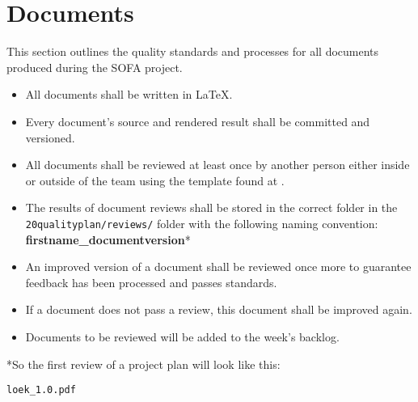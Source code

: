 \section{Documents}
This section outlines the quality standards and processes for all documents produced during the SOFA project.

\begin{itemize}
	\item All documents shall be written in LaTeX.
	\item Every document's source and rendered result shall be committed and versioned.
	\item All documents shall be reviewed at least once by another person either inside or outside of the team using the template found at .
	\item The results of document reviews shall be stored in the correct folder in the \texttt{20qualityplan/reviews/} folder with the following naming convention:\\
	\textbf{firstname\_documentversion}*
	\item An improved version of a document shall be reviewed once more to guarantee feedback has been processed and passes standards.
	\item If a document does not pass a review, this document shall be improved again.
	\item Documents to be reviewed will be added to the week's backlog.
\end{itemize}

*So the first review of a project plan will look like this:

\texttt{loek\_1.0.pdf}
